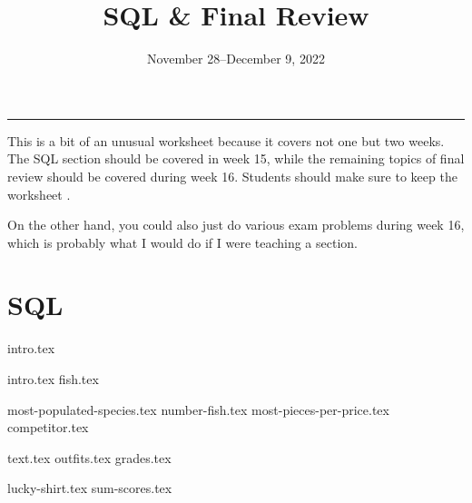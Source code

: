 \documentclass{exam}
\title{SQL \& Final Review}
\date{November 28--December 9, 2022}
\begin{document}
\maketitle\rule{\textwidth}{0.15em}

\begin{guide}
    This is a bit of an unusual worksheet because it covers not one but two weeks. The SQL section should be covered in week 15, while the 
    remaining topics of final review should be covered during week 16. Students should make sure to keep the worksheet . 

    On the other hand, you could also just do various exam problems during week 16, which is probably what I would do if I were teaching a section. 
\end{guide}


\section{SQL}
{intro.tex}
\newpage
\begin{questions}
  \question 
  {intro.tex}
  {fish.tex}
  \begin{parts}
    {most-populated-species.tex}
    {number-fish.tex}
    {most-pieces-per-price.tex}
    {competitor.tex}
  \end{parts}
  \newpage
  \question
  {text.tex}
  {outfits.tex}
  {grades.tex}
  \begin{parts}
  {lucky-shirt.tex}
  {sum-scores.tex}
  \end{parts}
\end{questions}
\end{document}
